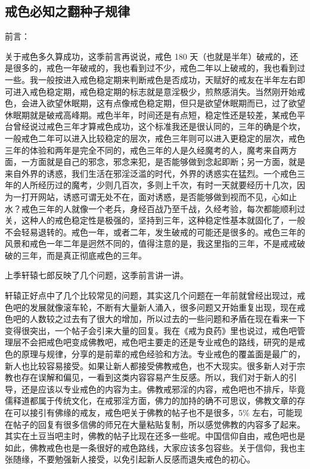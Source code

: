 \documentclass{ctexart}
\begin{document}
\subsection{戒色必知之翻种子规律}

前言：

关于戒色多久算成功，这季前言再说说，戒色 180 天（也就是半年）破戒的，还是很多的，戒色一年破戒的，我也看到过不少，戒色二年以上破戒的，我也看到过一些。我一般按进入戒色稳定期来判断戒色是否成功，天赋好的戒友在半年左右即可进入戒色稳定期，戒色稳定期的标志就是意淫极少，煎熬感消失。当然刚开始戒色，会进入欲望休眠期，这有点像戒色稳定期，但只是欲望休眠期而已，过了欲望休眠期就是破戒高峰期。戒色半年，时间还是有点短，稳定性还是较差，某戒色平台曾经说过戒色三年才算戒色成功，这个标准我还是很认同的，三年的确是个坎，一般戒色二年可以进入比较稳定的层次，戒色三年则可以进入更稳定的层次，戒色三年的体验和两年是完全不同的，戒色三年的人是久经魔考的人，魔考来自两方面，一方面就是自己的邪念，邪念来犯，是否能够做到念起即断；另一方面，就是来自外界的诱惑，我们生活在邪淫泛滥的时代，外界的诱惑实在猛烈。一个戒色三年的人所经历过的魔考，少则几百次，多则上千次，有时一天就要经历十几次，因为一打开网站，诱惑可谓无处不在，面对诱惑，是否能够做到视而不见，心如止水？戒色三年的人就像一个老兵，身经百战乃至千战，久经考验，每次都能顺利过关，这种人的戒色稳定性是极强的，坚持到三年，这种稳定性基本就固化了，一般不会轻易退转的。戒色一年，或者二年，发生破戒的可能还是很多的。戒色三年的风景和戒色一年二年是迥然不同的，值得注意的是，我这里指的三年，不是戒戒破破的三年，而是真正彻底戒色的三年。

上季轩辕七郎反映了几个问题，这季前言讲一讲。

轩辕正好点中了几个比较常见的问题，其实这几个问题在一年前就曾经出现过，戒色吧的发展就像滚车轮，不断有大量新人涌入，很多问题又开始重复出现，现在戒色吧的人数较之过去有了很大的增加，所以过去的一些问题和矛盾在现在看来一下变得很突出，一个帖子会引来大量的回复。我在《戒为良药》里也说过，戒色吧管理层不会把戒色吧变成佛教吧，戒色吧主要走的还是专业戒色的路线，研究的是戒色的原理与规律，分享的是前辈的戒色经验和方法。专业戒色的覆盖面是最广的，新人也比较容易接受。如果让新人都接受佛教戒色，也不大现实。很多新人对于宗教也存在误解和偏见，一看到这类内容容易产生反感。所以，我们对于新人的引导，还是应该以专业戒色的内容为主。佛教戒邪淫的内容，戒色吧也不排斥，毕竟儒释道都属于传统文化，在戒邪淫方面，佛力的加持的确不可思议，佛教文章的存在可以接引有佛缘的戒友，戒色吧关于佛教的帖子也不是很多，5\% 左右，可能现在帖子的回复有很多信佛的师兄在大量粘贴复制，所以感觉佛教的内容多了起来。其实在土豆当吧主时，佛教的帖子比现在还多一些呢。中国信仰自由，戒色吧也是如此，佛教戒色也是一条很好的戒色路线，大家应该多包容些。关于信仰，我也主张随缘，不要勉强新人接受，以免引起新人反感而退失戒色的初心。
\end{document}
